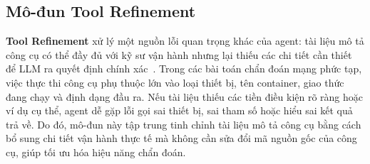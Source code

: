 \subsection{Mô-đun \textbf{Tool Refinement}}

\textbf{Tool Refinement} xử lý một nguồn lỗi quan trọng khác của agent: tài liệu mô tả công cụ có thể đầy đủ với kỹ sư vận hành nhưng lại thiếu các chi tiết cần thiết để LLM ra quyết định chính xác~\citep{draft2024}. Trong các bài toán chẩn đoán mạng phức tạp, việc thực thi công cụ phụ thuộc lớn vào loại thiết bị, tên container, giao thức đang chạy và định dạng đầu ra. Nếu tài liệu thiếu các tiền điều kiện rõ ràng hoặc ví dụ cụ thể, agent dễ gặp lỗi gọi sai thiết bị, sai tham số hoặc hiểu sai kết quả trả về. Do đó, mô-đun này tập trung tinh chỉnh tài liệu mô tả công cụ bằng cách bổ sung chi tiết vận hành thực tế mà không cần sửa đổi mã nguồn gốc của công cụ, giúp tối ưu hóa hiệu năng chẩn đoán.


